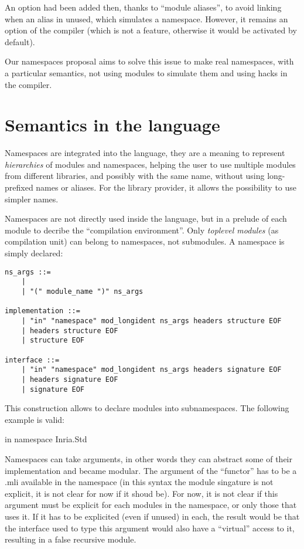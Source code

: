 \documentclass[11pt,a4paper]{article}
\begin{document}
An option had been added then, thanks to ``module aliases'', to avoid linking
when an alias in unused, which simulates a namespace. However, it remains an
option of the compiler (which is not a feature, otherwise it would be activated
by default). 

Our namespaces proposal aims to solve this issue to make real namespaces, with a
particular semantics, not using modules to simulate them and using hacks in the
compiler.

\section{Semantics in the language}

Namespaces are integrated into the language, they are a meaning to represent
\emph{hierarchies} of modules and namespaces, helping the user to use multiple
modules from different libraries, and possibly with the same name, without using
long-prefixed names or aliases. For the library provider, it allows the
possibility to use simpler names.

Namespaces are not directly used inside the language, but in a prelude of each
module to decribe the ``compilation environment''. Only \emph{toplevel modules}
(as compilation unit) can belong to namespaces, not submodules. A namespace is
simply declared: 

\begin{verbatim}
ns_args ::=
    | 
    | "(" module_name ")" ns_args

implementation ::=
    | "in" "namespace" mod_longident ns_args headers structure EOF
    | headers structure EOF
    | structure EOF

interface ::=
    | "in" "namespace" mod_longident ns_args headers signature EOF
    | headers signature EOF
    | signature EOF
\end{verbatim}

This construction allows to declare modules into subnamespaces. The following
example is valid:

\begin{OCaml}
in namespace Inria.Std
\end{OCaml}

Namespaces can take arguments, in other words they can abstract some of their
implementation and became modular. The argument of the ``functor'' has to be a
.mli available in the namespace (in this syntax the module singature is not
explicit, it is not clear for now if it shoud be). For now, it is not clear if
this argument must be explicit for each modules in the namespace, or only those
that uses it. If it has to be explicited (even if unused) in each, the result
would be that the interface used to type this argument would also have a
``virtual'' access to it, resulting in a false recursive module.
\end{document}
